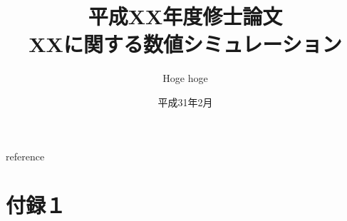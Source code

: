 \documentclass[a4paper]{bxjsreport}
\title{平成XX年度修士論文\\XXに関する数値シミュレーション}
\author{Hoge hoge}
\date{平成31年2月}
\begin{document}
\maketitle



\tableofcontents
\listoffigures
\listoftables









\begin{thebibliography}{99}
 reference
%
\end{thebibliography}


\appendix
\chapter{付録１}
\end{document}
